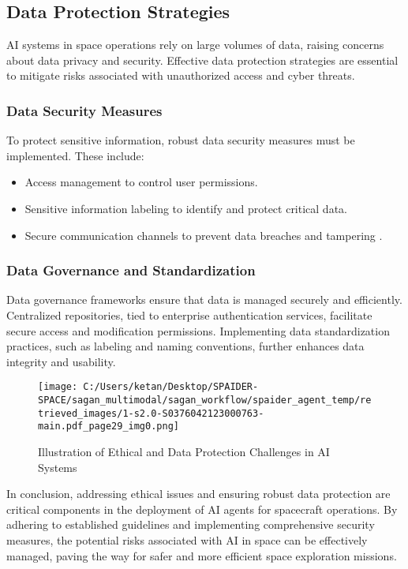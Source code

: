 \documentclass[a4paper,12pt]{article}
\begin{document}
\subsection{Data Protection Strategies}

AI systems in space operations rely on large volumes of data, raising concerns about data privacy and security. Effective data protection strategies are essential to mitigate risks associated with unauthorized access and cyber threats.

\subsubsection{Data Security Measures}

To protect sensitive information, robust data security measures must be implemented. These include:

\begin{itemize}
    \item Access management to control user permissions.
    \item Sensitive information labeling to identify and protect critical data.
    \item Secure communication channels to prevent data breaches and tampering \cite{data_security_15}.
\end{itemize}

\subsubsection{Data Governance and Standardization}

Data governance frameworks ensure that data is managed securely and efficiently. Centralized repositories, tied to enterprise authentication services, facilitate secure access and modification permissions. Implementing data standardization practices, such as labeling and naming conventions, further enhances data integrity and usability.

\begin{figure}[htbp]
    \centering
    \texttt{[image: C:/Users/ketan/Desktop/SPAIDER-SPACE/sagan\_multimodal/sagan\_workflow/spaider\_agent\_temp/retrieved\_images/1-s2.0-S0376042123000763-main.pdf\_page29\_img0.png]}
    \caption{Illustration of Ethical and Data Protection Challenges in AI Systems}
    \label{fig:ethical_data_protection}
\end{figure}

In conclusion, addressing ethical issues and ensuring robust data protection are critical components in the deployment of AI agents for spacecraft operations. By adhering to established guidelines and implementing comprehensive security measures, the potential risks associated with AI in space can be effectively managed, paving the way for safer and more efficient space exploration missions.
\end{document}
